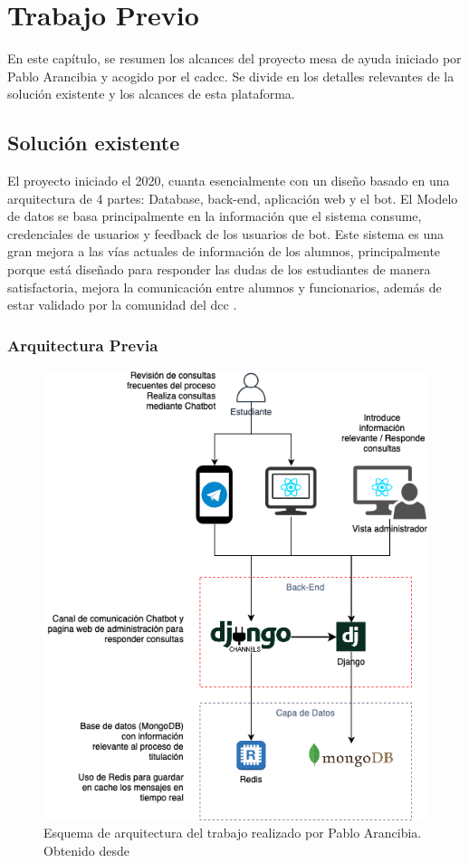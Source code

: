 \chapter{Trabajo Previo}
 En este capítulo, se resumen los alcances del proyecto mesa de ayuda iniciado por Pablo Arancibia y acogido por el \acrshort{cadcc}. Se divide en los detalles relevantes de la solución existente y los alcances de esta plataforma.
\section{Solución existente}
    El proyecto iniciado el 2020, cuanta esencialmente con un diseño basado en una arquitectura de 4 partes: Database, back-end, aplicación web y el bot. El Modelo de datos se basa principalmente en la información que el sistema consume, credenciales de usuarios y feedback de los usuarios de bot. Este sistema es una gran mejora a las vías actuales de información de los alumnos, principalmente porque está diseñado para responder las dudas de los estudiantes de manera satisfactoria, mejora la comunicación entre alumnos y funcionarios, además de estar validado por la comunidad del dcc \cite{ARANCIBIA2021}.

    \subsection{Arquitectura Previa}
        \begin{figure}[h]
            \centering
            \includegraphics[scale=0.5]{media/imagenes/trabajo_previo/arquitectura_del_sistema.png}
            \caption[Arquitectura sistema anterior]{Esquema de arquitectura del trabajo realizado por Pablo Arancibia. Obtenido desde \cite{ARANCIBIA2021}}
            \label{fig:arc-previa}
        \end{figure}

